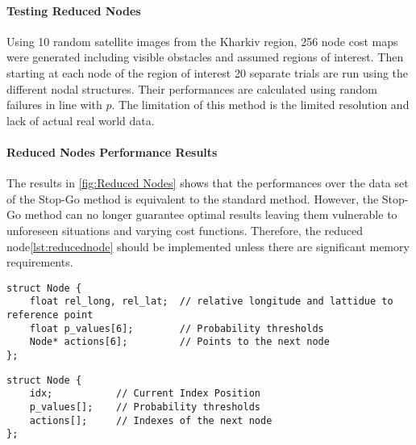 \paragraph{Testing Reduced Nodes}
Using 10 random satellite images from the Kharkiv region, 256 node cost maps were generated including visible obstacles and assumed regions of interest. Then starting at each node of the region of interest 20 separate trials are run using the different nodal structures. Their performances are calculated using random failures in line with $p$. The limitation of this method is the limited resolution and lack of actual real world data.
\paragraph{Reduced Nodes Performance Results}
The results in \ref{fig:Reduced Nodes} shows that the performances over the data set of the Stop-Go method is equivalent to the standard method. However, the Stop-Go method can no longer guarantee optimal results leaving them vulnerable to unforeseen situations and varying cost functions. Therefore, the reduced node\ref{lst:reducednode} should be implemented unless there are significant memory requirements.

\begin{lstlisting}[caption={Implementated Node Structure},label={lst:node}]
struct Node {
    float rel_long, rel_lat;  // relative longitude and lattidue to reference point
    float p_values[6];        // Probability thresholds
    Node* actions[6];         // Points to the next node
};
\end{lstlisting}
\begin{lstlisting}[caption={Node Structure},label={lst:reducednode}]
struct Node {
    idx;           // Current Index Position
    p_values[];    // Probability thresholds
    actions[];     // Indexes of the next node
};
\end{lstlisting}

